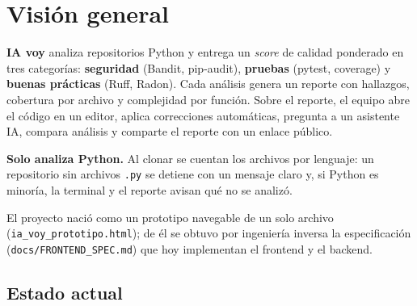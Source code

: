 \documentclass[11pt,a4paper]{article}
\newcommand{\code}[1]{\texttt{\small #1}}
\newcommand{\ruta}[1]{\texttt{\small\color{branddark}#1}}
\begin{document}
\section{Visión general}

\textbf{IA voy} analiza repositorios Python y entrega un \emph{score} de calidad ponderado en tres categorías:
\textcolor{seg}{\textbf{seguridad}} (Bandit, pip-audit), \textcolor{test}{\textbf{pruebas}} (pytest, coverage) y
\textcolor{prac}{\textbf{buenas prácticas}} (Ruff, Radon). Cada análisis genera un reporte con hallazgos, cobertura por
archivo y complejidad por función. Sobre el reporte, el equipo abre el código en un editor, aplica correcciones
automáticas, pregunta a un asistente IA, compara análisis y comparte el reporte con un enlace público.

\textbf{Solo analiza Python.} Al clonar se cuentan los archivos por lenguaje: un repositorio sin archivos
\code{.py} se detiene con un mensaje claro y, si Python es minoría, la terminal y el reporte avisan qué no se analizó.

El proyecto nació como un prototipo navegable de un solo archivo (\ruta{ia\_voy\_prototipo.html}); de él se obtuvo por
ingeniería inversa la especificación (\ruta{docs/FRONTEND\_SPEC.md}) que hoy implementan el frontend y el backend.

\subsection{Estado actual}
\end{document}
